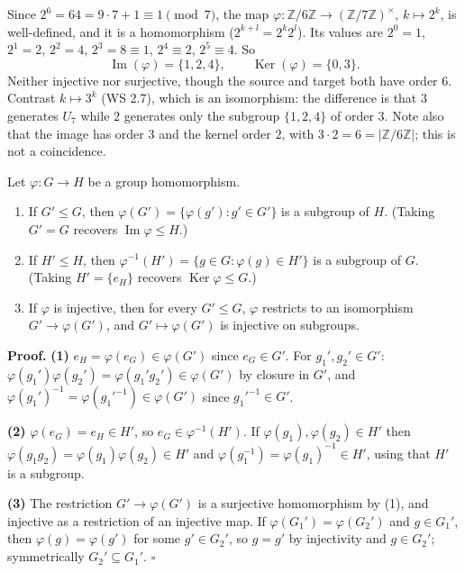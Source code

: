 \documentclass[11pt]{report}
\renewenvironment{proof}[1][Proof]{\noindent\textbf{#1.} }{\hfill$\square$\par\vspace{5pt}}
\begin{document}
\begin{exbox}\label{ex:z-6z-to-u7-k-maps-2k}
Since $2^6 = 64 = 9 \cdot 7 + 1 \equiv 1 \pmod 7$, the map $\varphi: \mathbb{Z}/6\mathbb{Z} \to (\mathbb{Z}/7\mathbb{Z})^\times$, $k \mapsto 2^k$, is well-defined, and it is a homomorphism ($2^{k+l} = 2^k 2^l$). Its values are $2^0 = 1$, $2^1 = 2$, $2^2 = 4$, $2^3 = 8 \equiv 1$, $2^4 \equiv 2$, $2^5 \equiv 4$. So
\[ \operatorname{Im}(\varphi) = \{1, 2, 4\}, \qquad \operatorname{Ker}(\varphi) = \{0, 3\}. \]
Neither injective nor surjective, though the source and target both have order $6$. Contrast $k \mapsto 3^k$ (WS 2.7), which is an isomorphism: the difference is that $3$ generates $U_7$ while $2$ generates only the subgroup $\{1, 2, 4\}$ of order $3$. Note also that the image has order $3$ and the kernel order $2$, with $3 \cdot 2 = 6 = |\mathbb{Z}/6\mathbb{Z}|$; this is not a coincidence.
\end{exbox}


\begin{propbox}\label{prop:images-preimages-subgroups}
Let $\varphi: G \to H$ be a group homomorphism.
\begin{enumerate}
    \item If $G' \leq G$, then $\varphi(G') = \{\varphi(g') : g' \in G'\}$ is a subgroup of $H$. (Taking $G' = G$ recovers $\operatorname{Im}\varphi \leq H$.)
    \item If $H' \leq H$, then $\varphi^{-1}(H') = \{g \in G : \varphi(g) \in H'\}$ is a subgroup of $G$. (Taking $H' = \{e_H\}$ recovers $\operatorname{Ker}\varphi \leq G$.)
    \item If $\varphi$ is injective, then for every $G' \leq G$, $\varphi$ restricts to an isomorphism $G' \to \varphi(G')$, and $G' \mapsto \varphi(G')$ is injective on subgroups.
\end{enumerate}
\end{propbox}

\begin{proof}
\textbf{(1)} $e_H = \varphi(e_G) \in \varphi(G')$ since $e_G \in G'$. For $g_1', g_2' \in G'$: $\varphi(g_1')\varphi(g_2') = \varphi(g_1'g_2') \in \varphi(G')$ by closure in $G'$, and $\varphi(g_1')^{-1} = \varphi(g_1'^{-1}) \in \varphi(G')$ since $g_1'^{-1} \in G'$.

\textbf{(2)} $\varphi(e_G) = e_H \in H'$, so $e_G \in \varphi^{-1}(H')$. If $\varphi(g_1), \varphi(g_2) \in H'$ then $\varphi(g_1g_2) = \varphi(g_1)\varphi(g_2) \in H'$ and $\varphi(g_1^{-1}) = \varphi(g_1)^{-1} \in H'$, using that $H'$ is a subgroup.

\textbf{(3)} The restriction $G' \to \varphi(G')$ is a surjective homomorphism by (1), and injective as a restriction of an injective map. If $\varphi(G_1') = \varphi(G_2')$ and $g \in G_1'$, then $\varphi(g) = \varphi(g')$ for some $g' \in G_2'$, so $g = g'$ by injectivity and $g \in G_2'$; symmetrically $G_2' \subseteq G_1'$.
\end{proof}
\end{document}
